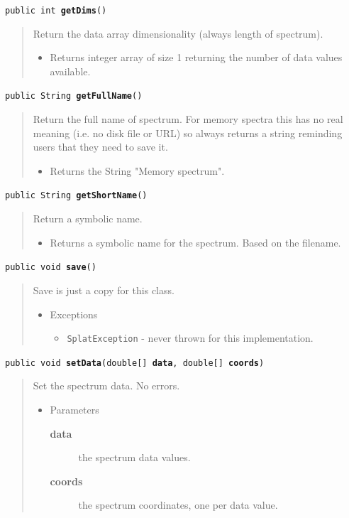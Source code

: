 \documentclass[twoside,11pt]{article}
\renewcommand{\_}{\texttt{\symbol{95}}}
\newcommand{\method}[1]{\texttt{#1}}
\newenvironment{desc}{\begin{quote}}{\end{quote}}
\begin{document}
\method{public int \textbf{getDims}()\label{l15}\label{l16}}
\begin{desc}Return the data array dimensionality (always length of
 spectrum).
\begin{itemize}
\item{Returns integer array of size 1 returning the number of data
                 values available. }
\end{itemize}
\end{desc}

\method{public String \textbf{getFullName}()\label{l17}\label{l18}}
\begin{desc}Return the full name of spectrum. For memory spectra this has
 no real meaning (i.e. no disk file or URL) so always returns a
 string reminding users that they need to save it.
\begin{itemize}
\item{Returns the String "Memory spectrum". }
\end{itemize}
\end{desc}

\method{public String \textbf{getShortName}()\label{l19}\label{l20}}
\begin{desc}Return a symbolic name.
\begin{itemize}
\item{Returns a symbolic name for the spectrum. Based on the filename. }
\end{itemize}
\end{desc}

\method{public void \textbf{save}()\label{l21}\label{l22}}
\begin{desc}Save is just a copy for this class.
\begin{itemize}
\item{{Exceptions}
  \begin{itemize}
   \item{\vspace{-.6ex}\texttt{SplatException} - never thrown for this implementation.}
  \end{itemize}
}
\end{itemize}
\end{desc}

\method{public void \textbf{setData}(\texttt{double[]} \textbf{data}, \texttt{double[]} \textbf{coords})\label{l23}\label{l24}}
\begin{desc}Set the spectrum data. No errors.
\begin{itemize}
\item{Parameters
  \begin{description}
   \item[\textbf{data}]{the spectrum data values.}
   \item[\textbf{coords}]{the spectrum coordinates, one per data value.}
  \end{description}}
\end{itemize}
\end{desc}
\end{document}
